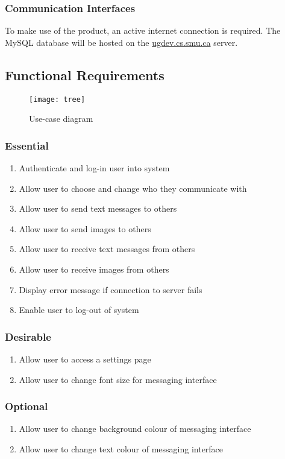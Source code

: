 \documentclass[11pt]{article}
\begin{document}
\subsubsection{Communication Interfaces}
To make use of the product, an active internet connection is required. The MySQL database will be
hosted on the \url{ugdev.cs.smu.ca} server.

\subsection{Functional Requirements}

\begin{figure}[!htb]
  \texttt{[image: tree]}
  \caption{Use-case diagram}
\end{figure}

\subsubsection{Essential}
\begin{enumerate}
    \item Authenticate and log-in user into system
    \item Allow user to choose and change who they communicate with
    \item Allow user to send text messages to others
    \item Allow user to send images to others
    \item Allow user to receive text messages from others
    \item Allow user to receive images from others
    \item Display error message if connection to server fails
    \item Enable user to log-out of system
\end{enumerate}

\subsubsection{Desirable}
\begin{enumerate}
    \item Allow user to access a settings page
    \item Allow user to change font size for messaging interface
\end{enumerate}

\subsubsection{Optional}
\begin{enumerate}
    \item Allow user to change background colour of messaging interface
    \item Allow user to change text colour of messaging interface
\end{enumerate}
\end{document}
